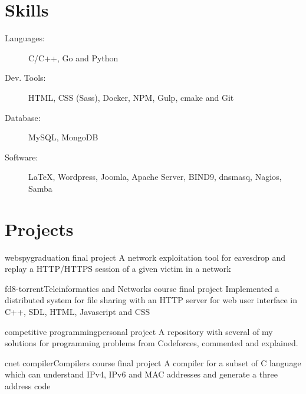 \documentclass{cv}
\begin{document}
  \section{Skills}
  \begin{description}
    \item[Languages:] C/C++, Go and Python
    \item[Dev. Tools:] HTML, CSS (Sass), Docker, NPM, Gulp, cmake and Git
    \item[Database:] MySQL, MongoDB
    \item[Software:] \LaTeX, Wordpress, Joomla, Apache Server, BIND9, dnsmasq, Nagios, Samba
  \end{description}

  \section{Projects}
  \begin{chronoitem}{webspy}{graduation final project}{}
    A network exploitation tool for eavesdrop and replay a HTTP/HTTPS session of a given victim in a network
  \end{chronoitem}

  \begin{chronoitem}{fd8-torrent}{Teleinformatics and Networks course final project}{}
    Implemented a distributed system for file sharing with an HTTP server for web user interface in C++, SDL, HTML, Javascript and CSS
  \end{chronoitem}

  \begin{chronoitem}{competitive programming}{personal project}{}
    A repository with several of my solutions for programming problems from Codeforces, commented and explained.
  \end{chronoitem}

  \begin{chronoitem}{cnet compiler}{Compilers course final project}{}
    A compiler for a subset of C language which can understand IPv4, IPv6 and MAC addresses and generate a three address code
  \end{chronoitem}
\end{document}
